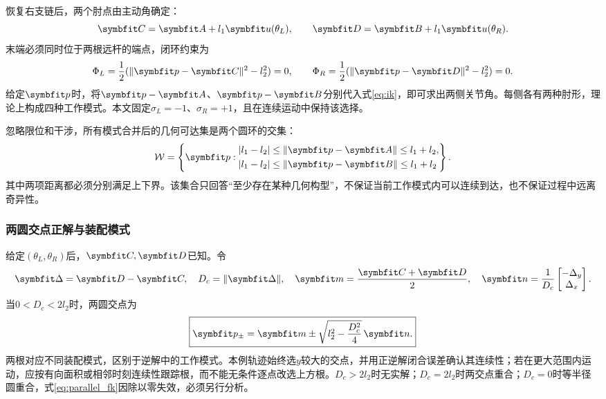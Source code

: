 恢复右支链后，两个肘点由主动角确定：
\begin{equation}
\vect C=\vect A+l_1\vect u(\theta_L),\qquad
\vect D=\vect B+l_1\vect u(\theta_R).
\end{equation}
末端必须同时位于两根远杆的端点，闭环约束为
\begin{equation}
\Phi_L=\frac12(\|\vect p-\vect C\|^2-l_2^2)=0,\qquad
\Phi_R=\frac12(\|\vect p-\vect D\|^2-l_2^2)=0.
\label{eq:closure}
\end{equation}
给定$\vect p$时，将$\vect p-\vect A$、$\vect p-\vect B$分别代入式\eqref{eq:ik}，即可求出两侧关节角。每侧各有两种肘形，理论上构成四种工作模式。本文固定$\sigma_L=-1$、$\sigma_R=+1$，且在连续运动中保持该选择。

忽略限位和干涉，所有模式合并后的几何可达集是两个圆环的交集：
\begin{equation}
\mathcal W=\left\{\vect p:\begin{aligned}
|l_1-l_2|&\leq\|\vect p-\vect A\|\leq l_1+l_2,\\
|l_1-l_2|&\leq\|\vect p-\vect B\|\leq l_1+l_2
\end{aligned}\right\}.
\end{equation}
其中两项距离都必须分别满足上下界。该集合只回答“至少存在某种几何构型”，不保证当前工作模式内可以连续到达，也不保证过程中远离奇异性\cite{liu2006}。

\subsubsection{两圆交点正解与装配模式}

给定$(\theta_L,\theta_R)$后，$\vect C,\vect D$已知。令
\begin{equation}
\vect\Delta=\vect D-\vect C,\quad D_c=\|\vect\Delta\|,\quad
\vect m=\frac{\vect C+\vect D}{2},\quad
\vect n=\frac{1}{D_c}\begin{bmatrix}-\Delta_y\\\Delta_x\end{bmatrix}.
\end{equation}
当$0<D_c<2l_2$时，两圆交点为
\begin{equation}
\boxed{\vect p_\pm=\vect m\pm\sqrt{l_2^2-\frac{D_c^2}{4}}\,\vect n.}
\label{eq:parallel_fk}
\end{equation}
两根对应不同装配模式，区别于逆解中的工作模式。本例轨迹始终选$y$较大的交点，并用正逆解闭合误差确认其连续性；若在更大范围内运动，应按有向面积或相邻时刻连续性跟踪根，而不能无条件逐点改选上方根。$D_c>2l_2$时无实解；$D_c=2l_2$时两交点重合；$D_c=0$时等半径圆重合，式\eqref{eq:parallel_fk}因除以零失效，必须另行分析。

